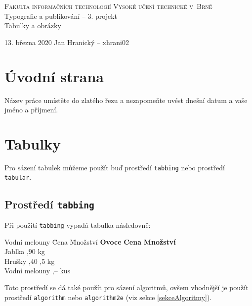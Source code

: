 \documentclass[11pt,a4paper]{article}
\begin{document}
\begin{titlepage}
\begin{center}

\Huge
\textsc{Fakulta informačních technologií Vysoké učení technické v~Brně\\}
\LARGE
Typografie a publikování -- 3. projekt \\
\Huge{Tabulky a obrázky}
\end{center}
{\large 13. března 2020 \hfill Jan Hranický -- xhrani02}
\end{titlepage}
\section{Úvodní strana}
Název práce umístěte do zlatého řezu a nezapomeňte uvést dnešní datum a vaše jméno a příjmení.
\section{Tabulky}
Pro sázení tabulek můžeme použít buď prostředí \texttt{tabbing} nebo prostředí \texttt{tabular}.
\subsection{Prostředí \texttt{tabbing}}
Při použití \texttt{tabbing} vypadá tabulka následovně:

\begin{tabbing}
   Vodní melouny \quad	\= Cena \quad	\= Množství	\kill
   \textbf{Ovoce} \> \textbf{Cena} \> \textbf{Množství}\\
   Jablka ,90  kg \\
   Hrušky ,40 ,5 kg\\
   Vodní melouny ,--  kus\\
\end{tabbing}
Toto prostředí se dá také použít pro sázení algoritmů, ovšem vhodnější je použít prostředí \texttt{algorithm} nebo \texttt{algorithm2e} (viz sekce \ref{sekceAlgoritmy}).
\end{document}
